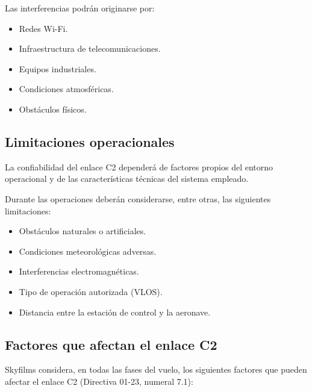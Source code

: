 Las interferencias podrán originarse por:

\begin{itemize}

\item Redes Wi-Fi.

\item Infraestructura de telecomunicaciones.

\item Equipos industriales.

\item Condiciones atmosféricas.

\item Obstáculos físicos.

\end{itemize}


\subsection{Limitaciones operacionales}

La confiabilidad del enlace C2 dependerá de factores propios del entorno operacional y de las características técnicas del sistema empleado.

Durante las operaciones deberán considerarse, entre otras, las siguientes limitaciones:

\begin{itemize}

\item Obstáculos naturales o artificiales.

\item Condiciones meteorológicas adversas.

\item Interferencias electromagnéticas.

\item Tipo de operación autorizada (VLOS).

\item Distancia entre la estación de control y la aeronave.

\end{itemize}

\subsection{Factores que afectan el enlace C2}

Skyfilms considera, en todas las fases del vuelo, los siguientes factores que pueden afectar el enlace C2 (Directiva 01-23, numeral 7.1):

